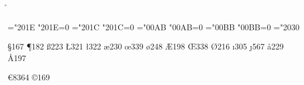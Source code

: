 \ifx\r\undefined \else \csaccents \fi  %

\chardef\clqq="201E   \sfcode"201E=0
\chardef\crqq="201C   \sfcode"201C=0
\chardef\flqq="00AB   \sfcode"00AB=0
\chardef\frqq="00BB   \sfcode"00BB=0
\def\ogonek #1{\setbox0\hbox{#1}\ifdim\ht0=1ex\accent"02DB #1%
   \else{\ooalign{\unhbox0\crcr\hss\char"02DB}}\fi}
\chardef\promile="2030
\let\extrahyphenchar=\undefined
\let\extrahyphens=\undefined
\def\uv{\bgroup\aftergroup\closequotes\leavevmode
        \afterassignment\clqq\let\next=}
\def\closequotes{\unskip\crqq\relax}


\chardef \S  167
\chardef \P  182
\chardef \ss 223
\chardef \L  321
\chardef \l  322
\chardef \ae 230   
\chardef \oe 339
\chardef \o  248 
\chardef \AE 198   
\chardef \OE 338    
\chardef \O  216   
\chardef \i  305
\chardef \j  567
\chardef \aa 229
\chardef \AA 197   

\chardef {}
\chardef {}
\chardef {}
\chardef {}
\chardef \euro       8364
\chardef {}
\chardef \copyright  169
\chardef {}
\chardef {}


\chardef {}
\chardef {}
\chardef {}
\chardef {}
\chardef {}
\chardef {}
\chardef {}
\chardef {}
\chardef {}
\chardef {}
\chardef {}
\chardef {}
\chardef {}  
\let\pound=\sterling

\endinput
